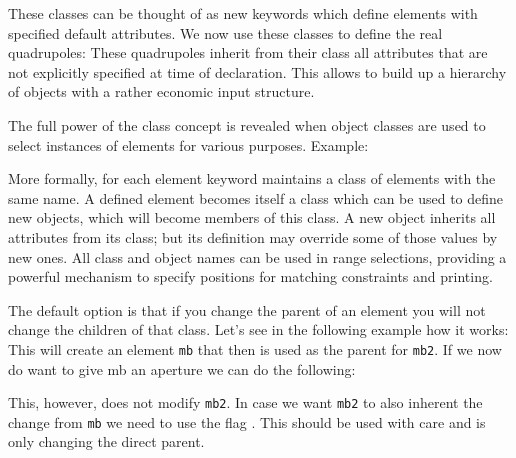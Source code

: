 These classes can be thought of as new keywords which define elements
with specified default attributes. We now use these classes to define
the real quadrupoles:  
These quadrupoles inherit from their class all attributes that are not
explicitly specified at time of declaration. 
This allows to build up a hierarchy of objects with a rather
economic input structure.  

The full power of the class concept is revealed when object classes are
used to select instances of elements for various purposes. Example:  



More formally, for each element keyword \madx maintains a class of
elements with the same name. A defined element becomes itself a class
which can be used to define new objects, which will become members of
this class. A new object inherits all attributes from its class; but its
definition may override some of those values by new ones. All class and
object names can be used in range selections, providing a powerful
mechanism to specify positions for matching constraints and printing.

The default option is that if you change the parent of an element you will
not change the children of that class. Let's see in the following example how 
it works:
 This will create an element \texttt{mb} that then is used as the parent for \texttt{mb2}. If we now do want to give mb
 an aperture we can do the following:

 This, however, does not modify \texttt{mb2}. In case we want \texttt{mb2} to also inherent the change from \texttt{mb} we need to use the
 flag . This should be used with care and is only changing the direct parent.
